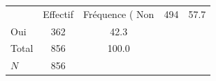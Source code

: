 {
\def\sym#1{\ifmmode^{#1}\else\(^{#1}\)\fi}
\begin{tabular}{l*{1}{cc}}
\toprule
            &    Effectif&Fréquence (%
\midrule
Non         &         494&        57.7\\
Oui         &         362&        42.3\\
Total       &         856&       100.0\\
\midrule
\(N\)       &         856&            \\
\bottomrule
\end{tabular}
}
